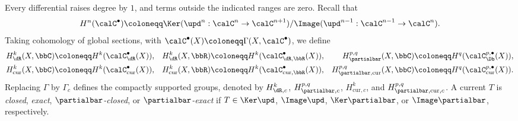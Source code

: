 \begin{construction}[label=\labelNFM{constr:cohomology-by-forms-and-currents}, status=draft, tag=0000000]
	Every differential raises degree by $1$, and terms outside the indicated ranges are zero.
	Recall that
	\[ H^n(\calC^\bullet) \coloneqq \Ker(\upd^n : \calC^n \to \calC^{n+1})/\Image(\upd^{n-1} : \calC^{n-1} \to \calC^n). \]
	Taking cohomology of global sections, with $\calC^\bullet(X) \coloneqq \Gamma(X,\calC^\bullet)$, we define
	\[
		\begin{aligned}
			H_\dR^k(X,\bbC)          & \coloneqq H^k(\calC_\dR^\bullet(X)),          & H_\dR^k(X,\bbR)          & \coloneqq H^k(\calC_{\dR,\bbR}^\bullet(X)),          & H_{\partialbar}^{p,q}(X,\bbC)              & \coloneqq H^q(\calC_\Db^{p,\bullet}(X)),          \\
			H_\mathrm{cur}^k(X,\bbC) & \coloneqq H^k(\calC_\mathrm{cur}^\bullet(X)), & H_\mathrm{cur}^k(X,\bbR) & \coloneqq H^k(\calC_{\mathrm{cur},\bbR}^\bullet(X)), & H_{\partialbar,\mathrm{cur}}^{p,q}(X,\bbC) & \coloneqq H^q(\calC_\mathrm{cur}^{p,\bullet}(X)).
		\end{aligned}
	\]
	Replacing $\Gamma$ by $\Gamma_c$ defines the compactly supported groups,
	denoted by $H_{\dR,c}^k$, $H_{\partialbar,c}^{p,q}$, $H_{\mathrm{cur},c}^k$, and $H_{\partialbar,\mathrm{cur},c}^{p,q}$.
	A current $T$ is \emph{closed}, \emph{exact}, \emph{$\partialbar$-closed}, or \emph{$\partialbar$-exact}
	if $T \in \Ker\upd$, $\Image\upd$, $\Ker\partialbar$, or $\Image\partialbar$, respectively.


\end{construction}
